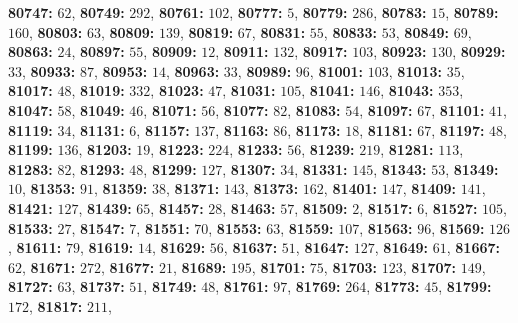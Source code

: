 \textsf{\bfseries 80747:} $62$, \textsf{\bfseries 80749:} $292$, \textsf{\bfseries 80761:} $102$, \textsf{\bfseries 80777:} $5$, \textsf{\bfseries 80779:} $286$, \textsf{\bfseries 80783:} $15$, \textsf{\bfseries 80789:} $160$, \textsf{\bfseries 80803:} $63$, \textsf{\bfseries 80809:} $139$, \textsf{\bfseries 80819:} $67$, \textsf{\bfseries 80831:} $55$, \textsf{\bfseries 80833:} $53$, \textsf{\bfseries 80849:} $69$, \textsf{\bfseries 80863:} $24$, \textsf{\bfseries 80897:} $55$, \textsf{\bfseries 80909:} $12$, \textsf{\bfseries 80911:} $132$, \textsf{\bfseries 80917:} $103$, \textsf{\bfseries 80923:} $130$, \textsf{\bfseries 80929:} $33$, \textsf{\bfseries 80933:} $87$, \textsf{\bfseries 80953:} $14$, \textsf{\bfseries 80963:} $33$, \textsf{\bfseries 80989:} $96$, \textsf{\bfseries 81001:} $103$, \textsf{\bfseries 81013:} $35$, \textsf{\bfseries 81017:} $48$, \textsf{\bfseries 81019:} $332$, \textsf{\bfseries 81023:} $47$, \textsf{\bfseries 81031:} $105$, \textsf{\bfseries 81041:} $146$, \textsf{\bfseries 81043:} $353$, \textsf{\bfseries 81047:} $58$, \textsf{\bfseries 81049:} $46$, \textsf{\bfseries 81071:} $56$, \textsf{\bfseries 81077:} $82$, \textsf{\bfseries 81083:} $54$, \textsf{\bfseries 81097:} $67$, \textsf{\bfseries 81101:} $41$, \textsf{\bfseries 81119:} $34$, \textsf{\bfseries 81131:} $6$, \textsf{\bfseries 81157:} $137$, \textsf{\bfseries 81163:} $86$, \textsf{\bfseries 81173:} $18$, \textsf{\bfseries 81181:} $67$, \textsf{\bfseries 81197:} $48$, \textsf{\bfseries 81199:} $136$, \textsf{\bfseries 81203:} $19$, \textsf{\bfseries 81223:} $224$, \textsf{\bfseries 81233:} $56$, \textsf{\bfseries 81239:} $219$, \textsf{\bfseries 81281:} $113$, \textsf{\bfseries 81283:} $82$, \textsf{\bfseries 81293:} $48$, \textsf{\bfseries 81299:} $127$, \textsf{\bfseries 81307:} $34$, \textsf{\bfseries 81331:} $145$, \textsf{\bfseries 81343:} $53$, \textsf{\bfseries 81349:} $10$, \textsf{\bfseries 81353:} $91$, \textsf{\bfseries 81359:} $38$, \textsf{\bfseries 81371:} $143$, \textsf{\bfseries 81373:} $162$, \textsf{\bfseries 81401:} $147$, \textsf{\bfseries 81409:} $141$, \textsf{\bfseries 81421:} $127$, \textsf{\bfseries 81439:} $65$, \textsf{\bfseries 81457:} $28$, \textsf{\bfseries 81463:} $57$, \textsf{\bfseries 81509:} $2$, \textsf{\bfseries 81517:} $6$, \textsf{\bfseries 81527:} $105$, \textsf{\bfseries 81533:} $27$, \textsf{\bfseries 81547:} $7$, \textsf{\bfseries 81551:} $70$, \textsf{\bfseries 81553:} $63$, \textsf{\bfseries 81559:} $107$, \textsf{\bfseries 81563:} $96$, \textsf{\bfseries 81569:} $126$, \textsf{\bfseries 81611:} $79$, \textsf{\bfseries 81619:} $14$, \textsf{\bfseries 81629:} $56$, \textsf{\bfseries 81637:} $51$, \textsf{\bfseries 81647:} $127$, \textsf{\bfseries 81649:} $61$, \textsf{\bfseries 81667:} $62$, \textsf{\bfseries 81671:} $272$, \textsf{\bfseries 81677:} $21$, \textsf{\bfseries 81689:} $195$, \textsf{\bfseries 81701:} $75$, \textsf{\bfseries 81703:} $123$, \textsf{\bfseries 81707:} $149$, \textsf{\bfseries 81727:} $63$, \textsf{\bfseries 81737:} $51$, \textsf{\bfseries 81749:} $48$, \textsf{\bfseries 81761:} $97$, \textsf{\bfseries 81769:} $264$, \textsf{\bfseries 81773:} $45$, \textsf{\bfseries 81799:} $172$, \textsf{\bfseries 81817:} $211$, 
